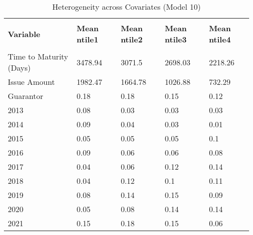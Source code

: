 \begin{table}[H]
\caption{Heterogeneity across Covariates (Model 10)}
\label{Het}
\footnotesize
\begin{tabular}{lllll}
\\[-1.8ex]\hline 
\hline \\[-1.8ex] 
{\color[HTML]{333333} \textbf{Variable}} & {\color[HTML]{333333} \textbf{Mean ntile1}} & {\color[HTML]{333333} \textbf{Mean ntile2}} & {\color[HTML]{333333} \textbf{Mean ntile3}} & {\color[HTML]{333333} \textbf{Mean ntile4}} \\
\hline \\[-1.8ex] 
Time to   Maturity (Days) & \cellcolor[HTML]{63BE7B}3478.94 & \cellcolor[HTML]{95D3A6}3071.5 & \cellcolor[HTML]{C2E5CD}2698.03 & \cellcolor[HTML]{FCFCFF}2218.26 \\
Issue Amount & \cellcolor[HTML]{63BE7B}1982.47 & \cellcolor[HTML]{8ACE9D}1664.78 & \cellcolor[HTML]{D8EEE0}1026.88 & \cellcolor[HTML]{FCFCFF}732.29 \\
Guarantor & \cellcolor[HTML]{DEF0E5}0.18 & \cellcolor[HTML]{DEF0E5}0.18 & \cellcolor[HTML]{E3F2EA}0.15 & \cellcolor[HTML]{E8F4EE}0.12 \\
2013 & \cellcolor[HTML]{EFF7F4}0.08 & \cellcolor[HTML]{F7FAFB}0.03 & \cellcolor[HTML]{F7FAFB}0.03 & \cellcolor[HTML]{F7FAFB}0.03 \\
2014 & \cellcolor[HTML]{EDF6F2}0.09 & \cellcolor[HTML]{F6FAFA}0.04 & \cellcolor[HTML]{F7FAFB}0.03 & \cellcolor[HTML]{FBFCFE}0.01 \\
2015 & \cellcolor[HTML]{F4F9F8}0.05 & \cellcolor[HTML]{F4F9F8}0.05 & \cellcolor[HTML]{F4F9F8}0.05 & \cellcolor[HTML]{ECF6F1}0.1 \\
2016 & \cellcolor[HTML]{EDF6F2}0.09 & \cellcolor[HTML]{F2F8F7}0.06 & \cellcolor[HTML]{F2F8F7}0.06 & \cellcolor[HTML]{EFF7F4}0.08 \\
2017 & \cellcolor[HTML]{F6FAFA}0.04 & \cellcolor[HTML]{F2F8F7}0.06 & \cellcolor[HTML]{E8F4EE}0.12 & \cellcolor[HTML]{E5F3EB}0.14 \\
2018 & \cellcolor[HTML]{F6FAFA}0.04 & \cellcolor[HTML]{E8F4EE}0.12 & \cellcolor[HTML]{ECF6F1}0.1 & \cellcolor[HTML]{EAF5F0}0.11 \\
2019 & \cellcolor[HTML]{EFF7F4}0.08 & \cellcolor[HTML]{E5F3EB}0.14 & \cellcolor[HTML]{E3F2EA}0.15 & \cellcolor[HTML]{EDF6F2}0.09 \\
2020 & \cellcolor[HTML]{F4F9F8}0.05 & \cellcolor[HTML]{EFF7F4}0.08 & \cellcolor[HTML]{E5F3EB}0.14 & \cellcolor[HTML]{E5F3EB}0.14 \\
2021 & \cellcolor[HTML]{E3F2EA}0.15 & \cellcolor[HTML]{DEF0E5}0.18 & \cellcolor[HTML]{E3F2EA}0.15 & \cellcolor[HTML]{F2F8F7}0.06 \\

\end{tabular}
\end{table}

